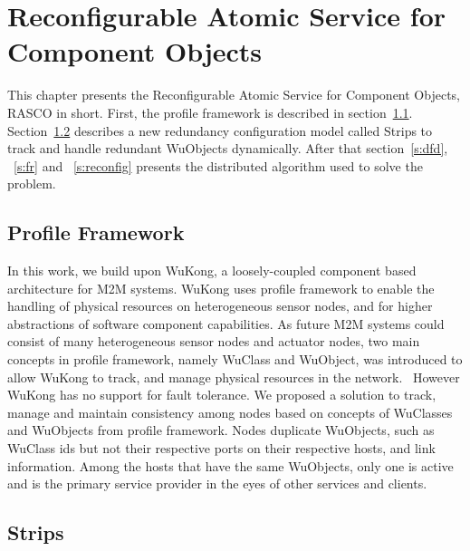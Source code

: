 \cleardoublepage
\singlespacing
\chapter{Reconfigurable Atomic Service for Component Objects}
\label{c:rasco}
\doublespacing\nointerlineskip

This chapter presents the Reconfigurable Atomic Service for Component Objects,
RASCO in short. First, the profile framework is described in section~\ref{s:pf}.
Section~\ref{s:ss} describes a new redundancy configuration model called Strips
to track and handle redundant WuObjects dynamically. After that section~\ref{s:dfd}, ~\ref{s:fr} and ~\ref{s:reconfig} presents the distributed algorithm used to
solve the problem. %

\section{Profile Framework}
\label{s:pf}

In this work, we build upon WuKong, a loosely-coupled component based
architecture for M2M systems. WuKong uses profile
framework to enable the handling of physical resources on heterogeneous sensor
nodes, and for higher abstractions of software component capabilities. As
future M2M systems could consist of many heterogeneous sensor nodes and
actuator nodes, two main concepts in profile framework, namely WuClass and
WuObject, was introduced to allow WuKong to track, and manage physical
resources in the network.~\cite{Reijers} However WuKong has no support for
fault tolerance. We proposed a solution to track, manage and maintain
consistency among nodes based on concepts of WuClasses and WuObjects from
profile framework. Nodes duplicate WuObjects, such as WuClass ids but not
their respective ports on their respective hosts, and link information. Among
the hosts that have the same WuObjects, only one is active and is the primary
service provider in the eyes of other services and clients.

\section{Strips} %
\label{s:ss}

